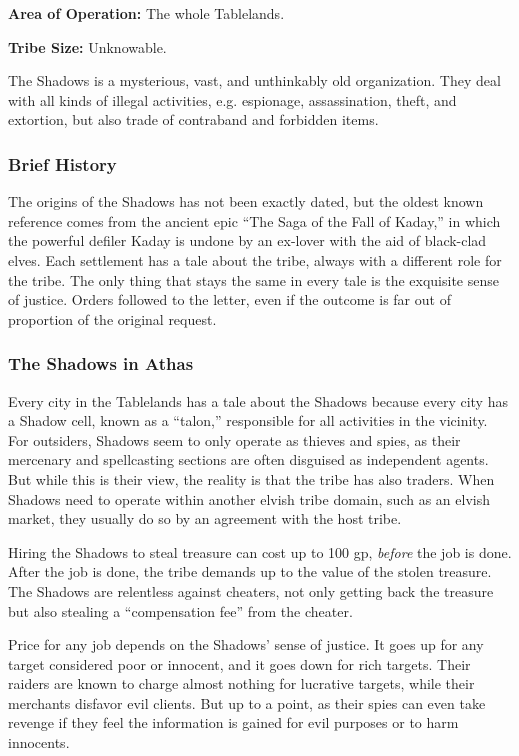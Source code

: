 \textbf{Area of Operation:} The whole Tablelands.

\textbf{Tribe Size:} Unknowable.

The Shadows is a mysterious, vast, and unthinkably old organization. They deal with all kinds of illegal activities, e.g. espionage, assassination, theft, and extortion, but also trade of contraband and forbidden items.

\subsubsection{Brief History}
The origins of the Shadows has not been exactly dated, but the oldest known reference comes from the ancient epic ``The Saga of the Fall of Kaday,'' in which the powerful defiler Kaday is undone by an ex-lover with the aid of black-clad elves. Each settlement has a tale about the tribe, always with a different role for the tribe. The only thing that stays the same in every tale is the exquisite sense of justice. Orders followed to the letter, even if the outcome is far out of proportion of the original request.

\subsubsection{The Shadows in Athas}
Every city in the Tablelands has a tale about the Shadows because every city has a Shadow cell, known as a ``talon,'' responsible for all activities in the vicinity. For outsiders, Shadows seem to only operate as thieves and spies, as their mercenary and spellcasting sections are often disguised as independent agents. But while this is their view, the reality is that the tribe has also traders. When Shadows need to operate within another elvish tribe domain, such as an elvish market, they usually do so by an agreement with the host tribe.

Hiring the Shadows to steal treasure can cost up to 100 gp, \emph{before} the job is done. After the job is done, the tribe demands up to \onehalf the value of the stolen treasure. The Shadows are relentless against cheaters, not only getting back the treasure but also stealing a ``compensation fee'' from the cheater.

Price for any job depends on the Shadows' sense of justice. It goes up for any target considered poor or innocent, and it goes down for rich targets. Their raiders are known to charge almost nothing for lucrative targets, while their merchants disfavor evil clients. But up to a point, as their spies can even take revenge if they feel the information is gained for evil purposes or to harm innocents.


